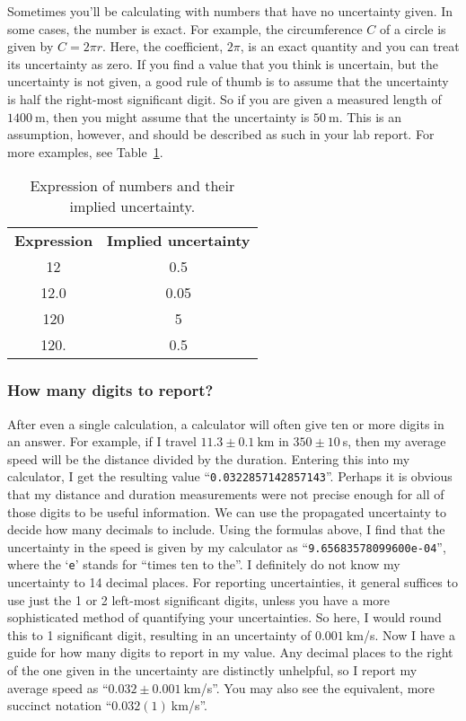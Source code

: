 Sometimes you'll be calculating with numbers that have no uncertainty given.
In some cases, the number is exact.
For example, the circumference $C$ of a circle is given by $C = 2 \pi r$. Here, the coefficient, $2\pi$, is an exact quantity and you can treat its uncertainty as zero.
If you find a value that you think is uncertain, but the uncertainty is not given, a good rule of thumb is to assume that the uncertainty is half the right-most significant digit.
So if you are given a measured length of $1400\:$m, then you might assume that the uncertainty is $50\:$m.
This is an assumption, however, and should be described as such in your lab report.
For more examples, see Table~\ref{unc:tab:implied}.

\begin{table}
	\begin{center}
		\begin{tabular}{cc}
			\textbf{Expression} & \textbf{Implied uncertainty} \\
			12 & 0.5 \\
			12.0 & 0.05 \\
			120 & 5 \\
			120. & 0.5
		\end{tabular}
		\caption{Expression of numbers and their implied uncertainty.}\label{unc:tab:implied}
	\end{center}
\end{table}

\subsubsection{How many digits to report?}

After even a single calculation, a calculator will often give ten or more digits in an answer.
For example, if I travel $11.3 \pm 0.1\:$km in $350 \pm 10\:$s, then my average speed will be the distance divided by the duration. Entering this into my calculator, I get the resulting value ``\texttt{0.0322857142857143}''.
Perhaps it is obvious that my distance and duration measurements were not precise enough for all of those digits to be useful information.
We can use the propagated uncertainty to decide how many decimals to include.
Using the formulas above, I find that the uncertainty in the speed is given by my calculator as ``\texttt{9.65683578099600e-04}'', where the `\texttt{e}' stands for ``times ten to the''.
I definitely do not know my uncertainty to 14 decimal places.
For reporting uncertainties, it general suffices to use just the 1 or 2 left-most significant digits, unless you have a more sophisticated method of quantifying your uncertainties.
So here, I would round this to 1 significant digit, resulting in an uncertainty of $0.001\:$km/s.
Now I have a guide for how many digits to report in my value.
Any decimal places to the right of the one given in the uncertainty are distinctly unhelpful, so I report my average speed as ``$0.032 \pm 0.001\:$km/s''.
You may also see the equivalent, more succinct notation ``$0.032(1)\:$km/s''.

